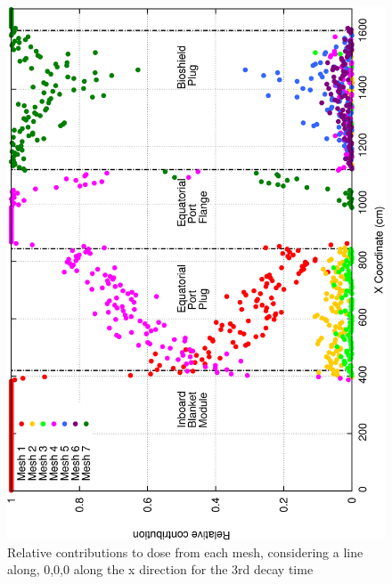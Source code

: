 \documentclass[12pt]{article}
\begin{document}
\begin{figure}[ht!]
\centering
\includegraphics[clip,scale=0.25]{../plots/crosstalk/b4c/ep/dc3_rel.png}
\caption{Relative contributions to dose from each mesh, considering a line along, 0,0,0 along the x direction for the 3rd decay time}
\label{fig:b4c_ct_ep_dc3_rel}
\end{figure}
\newpage
\clearpage
\end{document}
